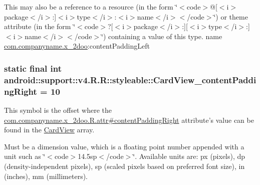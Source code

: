 This may also be a reference to a resource (in the form \char`\"{}$<$code$>$@\mbox{[}$<$i$>$package$<$/i$>$:\mbox{]}$<$i$>$type$<$/i$>$:$<$i$>$name$<$/i$>$$<$/code$>$\char`\"{}) or theme attribute (in the form \char`\"{}$<$code$>$?\mbox{[}$<$i$>$package$<$/i$>$:\mbox{]}\mbox{[}$<$i$>$type$<$/i$>$:\mbox{]}$<$i$>$name$<$/i$>$$<$/code$>$\char`\"{}) containing a value of this type.  name \hyperlink{namespacecom_1_1companyname_1_1x__2doo}{com.companyname.x\_\-2doo}:contentPaddingLeft \hypertarget{classandroid_1_1support_1_1v4_1_1_r_1_1styleable_4b71c60ba2365d3191e754c31a6013a6}{
\subsubsection[{CardView\_\-contentPaddingRight}]{\setlength{\rightskip}{0pt plus 5cm}static final int android::support::v4.R.R::styleable::CardView\_\-contentPaddingRight = 10}}
\label{classandroid_1_1support_1_1v4_1_1_r_1_1styleable_4b71c60ba2365d3191e754c31a6013a6}


This symbol is the offset where the \hyperlink{classcom_1_1companyname_1_1x__2doo_1_1_r_1_1attr_04875a7b7657e8dc4e1862c272181a24}{com.companyname.x\_\-2doo.R.attr\#contentPaddingRight} attribute's value can be found in the \hyperlink{classandroid_1_1support_1_1v4_1_1_r_1_1styleable_4fcc6453aa91deadd7072add3aee5e56}{CardView} array.

Must be a dimension value, which is a floating point number appended with a unit such as \char`\"{}$<$code$>$14.5sp$<$/code$>$\char`\"{}. Available units are: px (pixels), dp (density-independent pixels), sp (scaled pixels based on preferred font size), in (inches), mm (millimeters). 

